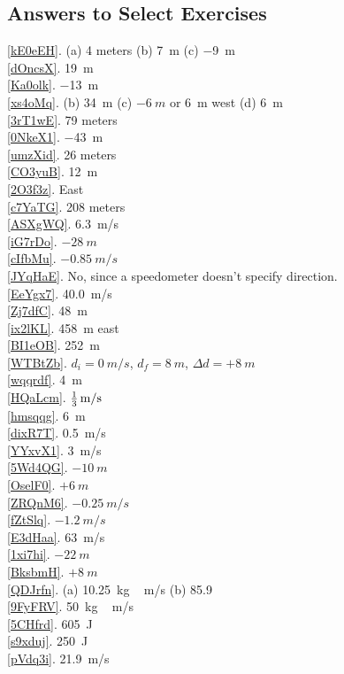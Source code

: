 \documentclass[main.tex]{subfiles}
\begin{document}
\clearpage
\subsection*{Answers to Select Exercises}

\ref{kE0eEH}. (a) 4 meters \hspace{1em} (b) \SI{+7}{m} \hspace{1em} (c) \SI{-9}{m}\\
\ref{dOncsX}. \SI{19}{m}\\
\ref{Ka0olk}. \SI{-13}{m}\\
\ref{xs4oMq}. (b) \SI{34}{m} \hspace{2em} (c) $-\SI{6}{m}$ or \SI{6}{m} west \hspace{2em} (d) \SI{6}{m}\\ 
\ref{3rT1wE}. 79 meters\\
\ref{0NkeX1}. \SI{-43}{m}\\
\ref{umzXid}. 26 meters\\
\ref{CO3yuB}. \SI{12}{m}\\
\ref{2O3f3z}. East\\
\ref{c7YaTG}. 208 meters\\
\ref{ASXgWQ}. \SI{6.3}{m/s}\\
\ref{iG7rDo}. $-\SI{28}{m}$\\
\ref{cIfbMu}. $-\SI{0.85}{m/s}$\\
\ref{JYqHaE}. No, since a speedometer doesn't specify direction.\\
\ref{EeYgx7}. \SI{40.0}{m/s}\\
\ref{Zj7dfC}. \SI{48}{m}\\
\ref{ix2lKL}. \SI{458}{m} east\\
\ref{BI1eOB}. \SI{252}{m}\\
\ref{WTBtZb}. $d_i=\SI{0}{m/s}$, $d_f=\SI{8}{m}$, $\Delta{d} = +\SI{8}{m}$\\
\ref{wqqrdf}. \SI{4}{m}\\
\ref{HQaLcm}. $\SI[parse-numbers = false]{\frac{1}{3}}{m/s}$\\
\ref{hmsqqg}. \SI{6}{m}\\
\ref{dixR7T}. \SI{0.5}{m/s}\\
\ref{YYxvX1}. \SI{3}{m/s}\\
\ref{5Wd4QG}. $-\SI{10}{m}$\\
\ref{OselF0}. $+\SI{6}{m}$\\
\ref{ZRQnM6}. $-\SI{0.25}{m/s}$\\
\ref{fZtSlq}. $-\SI{1.2}{m/s}$\\
\ref{E3dHaa}. \SI{63}{m/s}\\
\ref{1xi7hi}. $-\SI{22}{m}$\\
\ref{BksbmH}. $+\SI{8}{m}$\\
\ref{QDJrfn}. (a) \SI{10.25}{kg\,m/s} \hspace{1em} (b) 85.9\\
\ref{9FyFRV}. \SI{50}{kg\,m/s}\\
\ref{5CHfrd}. \SI{605}{J}\\
\ref{s9xduj}. \SI{250}{J}\\
\ref{pVdq3i}. \SI{21.9}{m/s}
\end{document}
